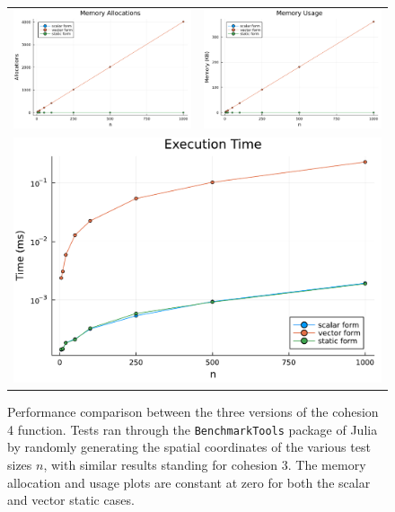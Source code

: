 \documentclass[12pt,	%
	a4paper,		%
	twoside,		%
	openright,		%
	titlepage,%
	]{book}
\theoremstyle{definition}
\begin{document}
\begin{figure}[h!]
\centering
\begin{tabular}{cc}
    \includegraphics[width=0.5\linewidth]{Plots/memory_allocations.pdf} &    \includegraphics[width=0.5\linewidth]{Plots/memory_usage.pdf} \\  
    \multicolumn{2}{c}{\includegraphics[width=1\linewidth]{Plots/execution_time.pdf} }\\
\end{tabular}
\caption[Cohesions 3 and 4 implementation comparison]{Performance comparison between the three versions of the cohesion 4 function. Tests ran through the \texttt{BenchmarkTools} package of Julia by randomly generating the spatial coordinates of the various test sizes $n$, with similar results standing for cohesion 3. The memory allocation and usage plots are constant at zero for both the scalar and vector static cases.}
\label{fig: cohesion3 comparison}
\end{figure}
\end{document}

